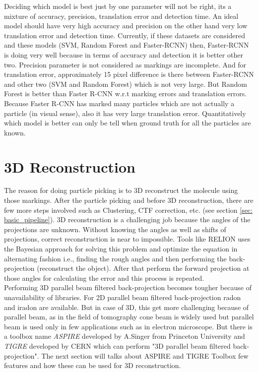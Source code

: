 \documentclass{report}
\begin{document}
Deciding which model is best just by one parameter will not be right, its a mixture of accuracy, precision, translation error and detection time. An ideal model should have very high accuracy and precision on the other hand very low translation error and detection time. Currently, if these datasets are considered and these models (SVM, Random Forest and Faster-RCNN) then, Faster-RCNN is doing very well because in terms of accuracy and detection it is better other two. Precision parameter is not considered as markings are incomplete. And for translation error, approximately 15 pixel difference is there between Faster-RCNN and other two (SVM and Random Forest) which is not very large. But Random Forest is better than Faster R-CNN w.r.t marking errors and translation errors. Because Faster R-CNN has marked many particles which are not actually a particle (in visual sense), also it has very large translation error. Quantitatively which model is better can only be tell when ground truth for all the particles are known. 

\chapter{3D Reconstruction}
The reason for doing particle picking is to 3D reconstruct the molecule using those markings. After the particle picking and before 3D reconstruction, there are few more steps involved such as Clustering, CTF correction, etc. (see section \ref{sec: basic_pipeline}). 3D reconstruction is a challenging job because the angles of the projections are unknown. Without knowing the angles as well as shifts of projections, correct reconstruction is near to impossible. Tools like RELION uses the Bayesian \cite{scheres2012relion} approach for solving this problem and optimize the equation in alternating fashion i.e., finding the rough angles and then performing the back-projection (reconstruct the object). After that perform the forward projection at those angles for calculating the error and this process is repeated. \\

Performing 3D parallel beam filtered back-projection becomes tougher because of unavailability of libraries. For 2D parallel beam filtered back-projection radon and iradon are available. But in case of 3D, this get more challenging because of parallel beam, as in the field of tomography cone beam is widely used but parallel beam is used only in few applications such as in electron microscope. But there is a toolbox name \textit{ASPIRE} developed by A.Singer from Princeton University and \textit{TIGRE} developed by CERN which can perform "3D parallel beam filtered back-projection". The next section will talks about ASPIRE and TIGRE Toolbox few features and how these can be used for 3D reconstruction.
\end{document}
